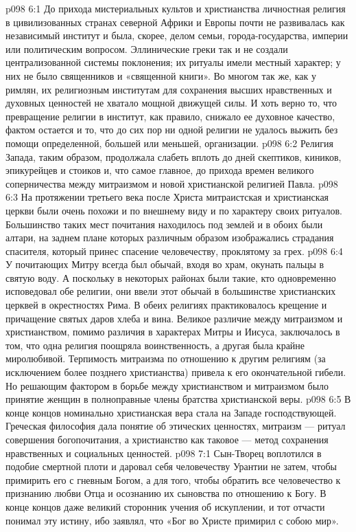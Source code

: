 \vs p098 6:1 До прихода мистериальных культов и христианства личностная религия в цивилизованных странах северной Африки и Европы почти не развивалась как независимый институт и была, скорее, делом семьи, города\hyp{}государства, империи или политическим вопросом. Эллинические греки так и не создали централизованной системы поклонения; их ритуалы имели местный характер; у них не было священников и «священной книги». Во многом так же, как у римлян, их религиозным институтам для сохранения высших нравственных и духовных ценностей не хватало мощной движущей силы. И хоть верно то, что превращение религии в институт, как правило, снижало ее духовное качество, фактом остается и то, что до сих пор ни одной религии не удалось выжить без помощи определенной, большей или меньшей, организации.
\vs p098 6:2 Религия Запада, таким образом, продолжала слабеть вплоть до дней скептиков, киников, эпикурейцев и стоиков и, что самое главное, до прихода времен великого соперничества между митраизмом и новой христианской религией Павла.
\vs p098 6:3 \pc На протяжении третьего века после Христа митраистская и христианская церкви были очень похожи и по внешнему виду и по характеру своих ритуалов. Большинство таких мест почитания находилось под землей и в обоих были алтари, на заднем плане которых различным образом изображались страдания спасителя, который принес спасение человечеству, проклятому за грех.
\vs p098 6:4 У почитающих Митру всегда был обычай, входя во храм, окунать пальцы в святую воду. А поскольку в некоторых районах были такие, кто одновременно исповедовал обе религии, они ввели этот обычай в большинстве христианских церквей в окрестностях Рима. В обеих религиях практиковалось крещение и причащение святых даров хлеба и вина. Великое различие между митраизмом и христианством, помимо различия в характерах Митры и Иисуса, заключалось в том, что одна религия поощряла воинственность, а другая была крайне миролюбивой. Терпимость митраизма по отношению к другим религиям (за исключением более позднего христианства) привела к его окончательной гибели. Но решающим фактором в борьбе между христианством и митраизмом было принятие женщин в полноправные члены братства христианской веры.
\vs p098 6:5 \pc В конце концов номинально христианская вера стала на Западе господствующей. Греческая философия дала понятие об этических ценностях, митраизм --- ритуал совершения богопочитания, а христианство как таковое --- метод сохранения нравственных и социальных ценностей.
\vs p098 7:1 Сын\hyp{}Творец воплотился в подобие смертной плоти и даровал себя человечеству Урантии не затем, чтобы примирить его с гневным Богом, а для того, чтобы обратить все человечество к признанию любви Отца и осознанию их сыновства по отношению к Богу. В конце концов даже великий сторонник учения об искуплении, и тот отчасти понимал эту истину, ибо заявлял, что «Бог во Христе примирил с собою мир».
